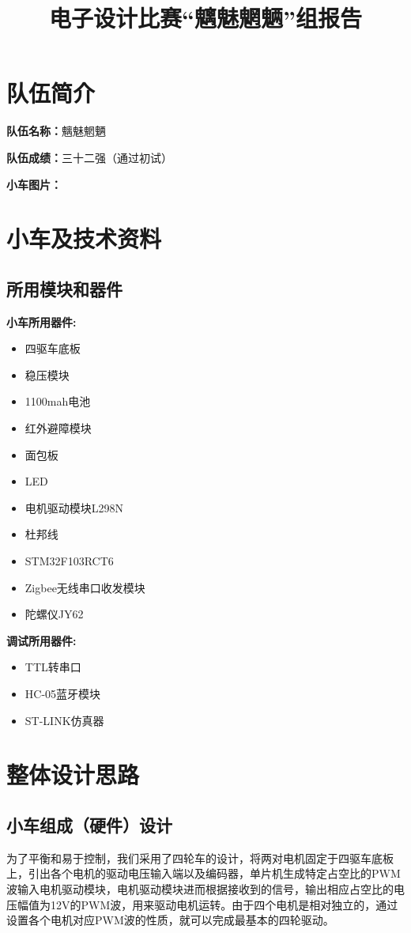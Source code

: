 \documentclass[UTF8]{ctexart}
\begin{document}
\title{电子设计比赛“魑魅魍魉”组报告}
\maketitle

\tableofcontents
\newpage
\section{队伍简介}
\textbf{队伍名称：}魑魅魍魉

\textbf{队伍成绩：}三十二强（通过初试）

\textbf{小车图片：}
\section{小车及技术资料}
\subsection{所用模块和器件}
\textbf{小车所用器件:}
\begin{itemize}
\item 四驱车底板
\item 稳压模块
\item 1100mah电池
\item 红外避障模块
\item 面包板
\item LED
\item 电机驱动模块L298N
\item 杜邦线
\item STM32F103RCT6
\item Zigbee无线串口收发模块
\item 陀螺仪JY62
\end{itemize}
\textbf{调试所用器件:}
\begin{itemize}
\item TTL转串口
\item HC-05蓝牙模块
\item ST-LINK仿真器
\end{itemize}
\section{整体设计思路}
\subsection{小车组成（硬件）设计}
为了平衡和易于控制，我们采用了四轮车的设计，将两对电机固定于四驱车底板上，引出各个电机的驱动电压输入端以及编码器，单片机生成特定占空比的PWM波输入电机驱动模块，电机驱动模块进而根据接收到的信号，输出相应占空比的电压幅值为12V的PWM波，用来驱动电机运转。由于四个电机是相对独立的，通过设置各个电机对应PWM波的性质，就可以完成最基本的四轮驱动。
\end{document}
